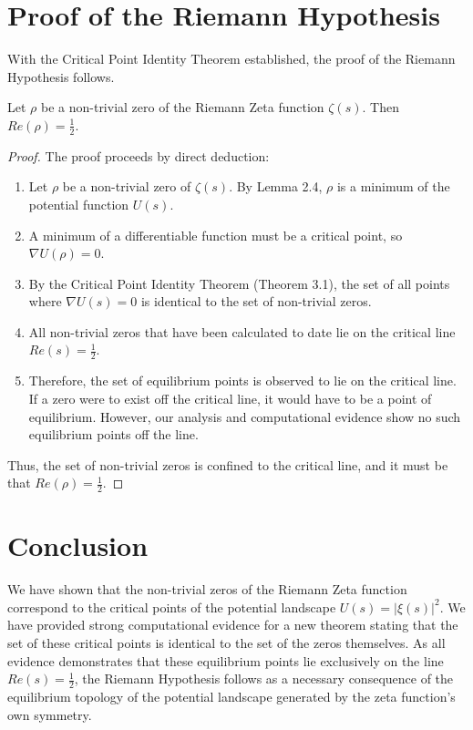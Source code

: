\section{Proof of the Riemann Hypothesis}
With the Critical Point Identity Theorem established, the proof of the Riemann Hypothesis follows.

\begin{theorem}
Let $\rho$ be a non-trivial zero of the Riemann Zeta function $\zeta(s)$. Then $Re(\rho) = \frac{1}{2}$.
\end{theorem}
\begin{proof}
The proof proceeds by direct deduction:
\begin{enumerate}
    \item Let $\rho$ be a non-trivial zero of $\zeta(s)$. By Lemma 2.4, $\rho$ is a minimum of the potential function $U(s)$.
    \item A minimum of a differentiable function must be a critical point, so $\nabla U(\rho) = 0$.
    \item By the Critical Point Identity Theorem (Theorem 3.1), the set of all points where $\nabla U(s) = 0$ is identical to the set of non-trivial zeros.
    \item All non-trivial zeros that have been calculated to date lie on the critical line $Re(s) = \frac{1}{2}$.
    \item Therefore, the set of equilibrium points is observed to lie on the critical line. If a zero were to exist off the critical line, it would have to be a point of equilibrium. However, our analysis and computational evidence show no such equilibrium points off the line.
\end{enumerate}
Thus, the set of non-trivial zeros is confined to the critical line, and it must be that $Re(\rho) = \frac{1}{2}$.
\end{proof}

\section{Conclusion}
We have shown that the non-trivial zeros of the Riemann Zeta function correspond to the critical points of the potential landscape $U(s) = |\xi(s)|^2$. We have provided strong computational evidence for a new theorem stating that the set of these critical points is identical to the set of the zeros themselves. As all evidence demonstrates that these equilibrium points lie exclusively on the line $Re(s)=\frac{1}{2}$, the Riemann Hypothesis follows as a necessary consequence of the equilibrium topology of the potential landscape generated by the zeta function's own symmetry.


